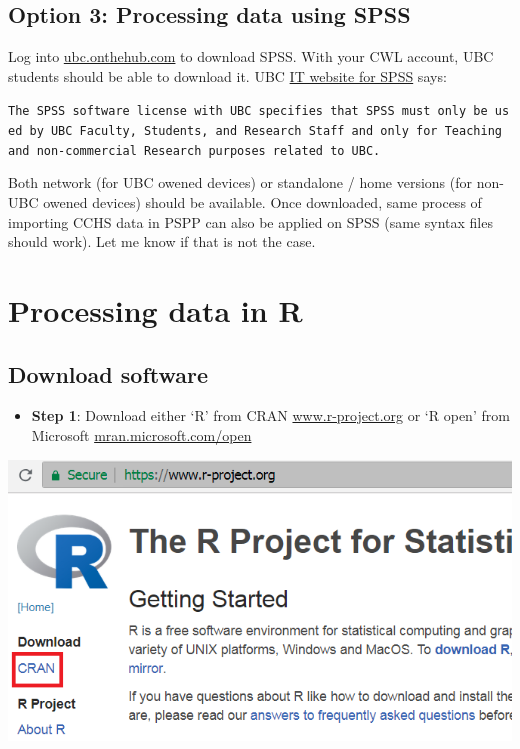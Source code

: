 \documentclass[
]{book}
\providecommand{\tightlist}{%
  \setlength{\itemsep}{0pt}\setlength{\parskip}{0pt}}
\begin{document}
\hypertarget{option-3-processing-data-using-spss}{%
\subsection{Option 3: Processing data using SPSS}\label{option-3-processing-data-using-spss}}

Log into \href{https://ubc.onthehub.com}{ubc.onthehub.com} to download SPSS. With your CWL account, UBC students should be able to download it. UBC \href{https://it.ubc.ca/services/desktop-print-services/software-licensing/spss}{IT website for SPSS} says:

\texttt{The\ SPSS\ software\ license\ with\ UBC\ specifies\ that\ SPSS\ must\ only\ be\ used\ by\ UBC\ Faculty,\ Students,\ and\ Research\ Staff\ and\ only\ for\ Teaching\ and\ non-commercial\ Research\ purposes\ related\ to\ UBC.}

Both network (for UBC owened devices) or standalone / home versions (for non-UBC owened devices) should be available. Once downloaded, same process of importing CCHS data in PSPP can also be applied on SPSS (same syntax files should work). Let me know if that is not the case.

\hypertarget{processing-data-in-r}{%
\section{Processing data in R}\label{processing-data-in-r}}

\hypertarget{download-software}{%
\subsection{Download software}\label{download-software}}

\begin{itemize}
\tightlist
\item
  \textbf{Step 1}: Download either `R' from CRAN \href{https://www.r-project.org/}{www.r-project.org} or `R open' from Microsoft \href{https://mran.microsoft.com/open}{mran.microsoft.com/open}
\end{itemize}

\includegraphics[width=0.65\linewidth]{images/R03}
\end{document}
